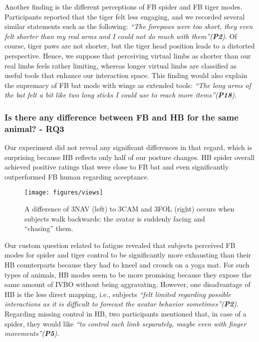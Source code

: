 \documentclass[conference]{IEEEtran}
\begin{document}
Another finding is the different perceptions of FB spider and FB tiger modes. Participants reported that the tiger felt less engaging, and we recorded several similar statements such as the following: \textit{``The forepaws were too short, they even felt shorter than my real arms and I could not do much with them''(\textbf{P2})}. Of course, tiger paws are not shorter, but the tiger head position leads to a distorted perspective. Hence, we suppose that perceiving virtual limbs as shorter than our real limbs feels rather limiting, whereas longer virtual limbs are classified as useful tools that enhance our interaction space. This finding would also explain the supremacy of FB bat mode with wings as extended tools: \textit{``The long arms of the bat felt a bit like two long sticks I could use to reach more items''(\textbf{P18})}. 


\subsubsection{Is there any difference between FB and HB for the same animal? - \textbf{RQ3}} Our experiment did not reveal any significant differences in that regard, which is surprising because HB reflects only half of our posture changes. HB spider overall achieved positive ratings that were close to FB bat and even significantly outperformed FB human regarding acceptance.

\begin{figure}[b]
\centering
\texttt{[image: figures/views]}
\caption{A difference of 3NAV (left) to 3CAM and 3FOL (right) occurs when subjects walk backwards: the avatar is suddenly facing and ``chasing'' them.
}
\label{fig:chase}
\end{figure}
Our custom question related to fatigue revealed that subjects perceived FB modes for spider and tiger control to be significantly more exhausting than their HB counterparts because they had to kneel and crouch on a yoga mat. For such types of animals, HB modes seem to be more promising because they expose the same amount of IVBO without being aggravating. However, one disadvantage of HB is the less direct mapping, i.e., subjects \textit{``felt limited regarding possible interactions as it is difficult to forecast the avatar behavior sometimes''(\textbf{P2})}. Regarding missing control in HB, two participants mentioned that, in case of a spider, they would like \textit{``to control each limb separately, maybe even with finger movements''(\textbf{P5})}.
\end{document}
